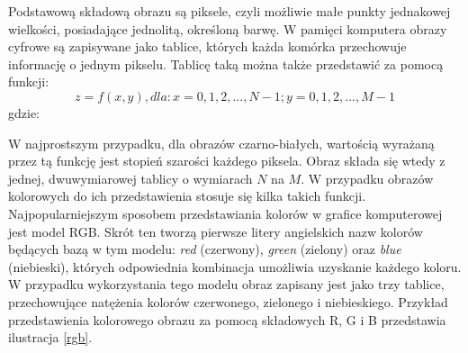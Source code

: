 Podstawową składową obrazu są piksele, czyli możliwie małe punkty jednakowej wielkości, posiadające jednolitą, określoną barwę. W pamięci komputera obrazy cyfrowe są zapisywane jako tablice, których każda komórka przechowuje informację o jednym pikselu. Tablicę taką można także przedstawić za pomocą funkcji:
\begin{equation}
	z = f(x,y), dla: x = 0, 1, 2, ..., N-1; y = 0, 1, 2, ..., M-1
   \label{funkcja_obrazu}
 \end{equation}
 gdzie:  
 \begin{equationDescriptor}
 \end{equationDescriptor}
 
W najprostszym przypadku, dla obrazów czarno-białych, wartością wyrażaną przez tą funkcję jest stopień szarości każdego piksela. Obraz składa się wtedy z jednej, dwuwymiarowej tablicy o wymiarach $N$ na $M$.
W przypadku obrazów kolorowych do ich przedstawienia stosuje się kilka takich funkcji. Najpopularniejszym sposobem przedstawiania kolorów w grafice komputerowej jest model RGB. Skrót ten tworzą pierwsze litery angielskich nazw kolorów będących bazą w tym modelu: \textit{red} (czerwony), \textit{green} (zielony) oraz \textit{blue} (niebieski), których odpowiednia kombinacja umożliwia uzyskanie każdego koloru. W przypadku wykorzystania tego modelu obraz zapisany jest jako trzy tablice, przechowujące natężenia kolorów czerwonego, zielonego i niebieskiego. Przykład przedstawienia kolorowego obrazu za pomocą składowych R, G i B przedstawia ilustracja \ref{rgb}. \newpage

